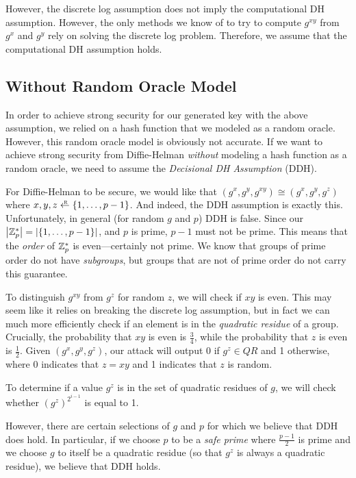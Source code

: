 However, the discrete log assumption does not imply the computational DH assumption. However, the only methods we know of to try to compute $g^{xy}$ from $g^x$ and $g^y$ rely on solving the discrete log problem. Therefore, we assume that the computational DH assumption holds. 

\subsection{Without Random Oracle Model}
In order to achieve strong security for our generated key with the above assumption, we relied on a hash function that we modeled as a random oracle. However, this random oracle model is obviously not accurate. If we want to achieve strong security from Diffie-Helman \emph{without} modeling a hash function as a random oracle, we need to assume the \emph{Decisional DH Assumption} (DDH).

For Diffie-Helman to be secure, we would like that $(g^x, g^y, g^{xy}) \cong (g^x, g^y, g^z)$ where $x, y, z \rgets \set{1, \ldots, p-1}$. And indeed, the DDH assumption is exactly this. Unfortunately, in general (for random $g$ and $p$) DDH is false. Since our $\left| \mathbb{Z}_p^* \right| = \left| \left\{ 1, \ldots, p-1 \right\} \right|$, and $p$ is prime, $p-1$ must not be prime. This means that the \emph{order} of $\mathbb{Z}_p^*$ is even---certainly not prime. We know that groups of prime order do not have \emph{subgroups}, but groups that are not of prime order do not carry this guarantee.

To distinguish $g^{xy}$ from $g^z$ for random $z$, we will check if $xy$ is even. This may seem like it relies on breaking the discrete log assumption, but in fact we can much more efficiently check if an element is in the \emph{quadratic residue} of a group. Crucially, the probability that $xy$ is even is $\tfrac{3}{4}$, while the probability that $z$ is even is $\tfrac{1}{2}$. Given $(g^x, g^y, g^z)$, our attack will output 0 if $g^z \in QR$ and 1 otherwise, where 0 indicates that $z = xy$ and 1 indicates that $z$ is random.

To determine if a value $g^z$ is in the set of quadratic residues of $g$, we will check whether $(g^z)^{2^{i-1}}$ is equal to 1.

However, there are certain selections of $g$ and $p$ for which we believe that DDH does hold. In particular, if we choose $p$ to be a \emph{safe prime} where $\frac{p-1}{2}$ is prime and we choose $g$ to itself be a quadratic residue (so that $g^z$ is always a quadratic residue), we believe that DDH holds.
